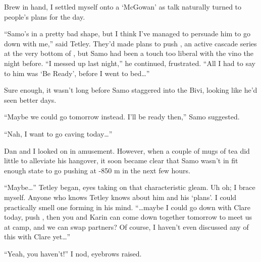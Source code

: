 Brew in hand, I settled myself onto a `McGowan' as
talk naturally turned to people's plans for the day.

``Samo's in a pretty bad shape, but I think I've managed to persuade him
to go down with me,'' said Tetley. They'd made plans to push
, an active cascade series at the very bottom of
, but Samo had been a touch too liberal with the vino
the night before. ``I messed up last night,'' he continued, frustrated.
``All I had to say to him was `Be Ready', before I went to bed\ldots{}''

Sure enough, it wasn't long before Samo staggered into the Bivi, looking
like he'd seen better days.

``Maybe we could go tomorrow instead. I'll be ready then,'' Samo
suggested.

``Nah, I want to go caving today\ldots{}''

Dan and I looked on in amusement. However, when a couple of mugs of tea
did little to alleviate his hangover, it soon became clear that Samo
wasn't in fit enough state to go pushing at -850 m in the next few
hours.

``Maybe\ldots{}'' Tetley began, eyes taking on that characteristic
gleam. Uh oh; I brace myself. Anyone who knows Tetley knows about him
and his `plans'. I could practically smell one forming in his mind.
``\ldots{}maybe I could go down with Clare today, push
, then you and Karin can come down together tomorrow
to meet us at camp, and we can swap partners? Of course, I haven't even
discussed any of this with Clare yet\ldots{}''

``Yeah, you haven't!'' I nod, eyebrows raised.

